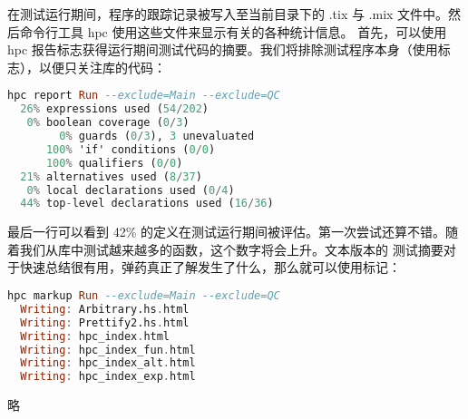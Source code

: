 \documentclass[./main.tex]{subfiles}
\begin{document}
在测试运行期间，程序的跟踪记录被写入至当前目录下的 .tix 与 .mix 文件中。然后命令行工具 hpc 使用这些文件来显示有关的各种统计信息。
首先，可以使用 hpc 报告标志获得运行期间测试代码的摘要。我们将排除测试程序本身（使用标志），以便只关注库的代码：

\begin{lstlisting}[language=Haskell]
  hpc report Run --exclude=Main --exclude=QC
  26% expressions used (54/202)
   0% boolean coverage (0/3)
        0% guards (0/3), 3 unevaluated
      100% 'if' conditions (0/0)
      100% qualifiers (0/0)
  21% alternatives used (8/37)
   0% local declarations used (0/4)
  44% top-level declarations used (16/36)
\end{lstlisting}

最后一行可以看到 42\% 的定义在测试运行期间被评估。第一次尝试还算不错。随着我们从库中测试越来越多的函数，这个数字将会上升。文本版本的
测试摘要对于快速总结很有用，弹药真正了解发生了什么，那么就可以使用标记：

\begin{lstlisting}[language=Haskell]
  hpc markup Run --exclude=Main --exclude=QC
  Writing: Arbitrary.hs.html
  Writing: Prettify2.hs.html
  Writing: hpc_index.html
  Writing: hpc_index_fun.html
  Writing: hpc_index_alt.html
  Writing: hpc_index_exp.html
\end{lstlisting}

略
\end{document}

